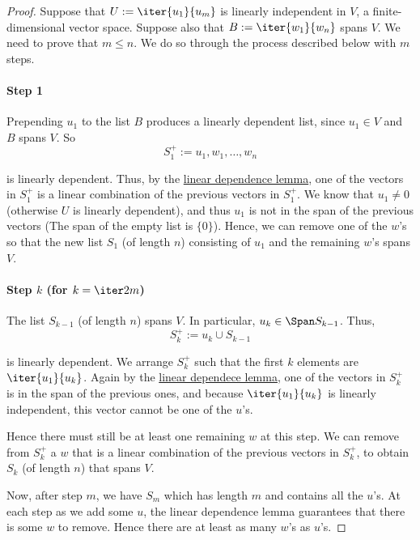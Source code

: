 \begin{proof}
  Suppose that $U:=\iter{u_1}{u_m}$ is linearly independent in $V$, a
  finite-dimensional vector space. Suppose also that $B:=\iter{w_1}{w_n}$ spans
  $V$. We need to prove that $m\leq n$. We do so through the process described
  below with $m$ steps.

  \paragraph{Step 1}

  Prepending $u_1$ to the list $B$ produces a linearly dependent list, since
  $u_1\in V$ and $B$ spans $V$. So
  $$
    S_1^+:=u_1,w_1,\ldots,w_n
  $$

  is linearly dependent. Thus, by the \href{ba96a6f}{linear dependence lemma},
  one of the vectors in $S_1^+$ is a linear combination of the previous vectors
  in $S_1^+$. We know that $u_1\neq0$ (otherwise $U$ is linearly dependent),
  and thus $u_1$ is not in the span of the previous vectors (The span of the
  empty list is $\{0\}$). Hence, we can remove one of the $w$'s so that the new
  list $S_1$ (of length $n$) consisting of $u_1$ and the remaining $w$'s spans
  $V$.

  \paragraph{Step $k$ (for $k=\iter2m$)}

  The list $S_{k-1}$ (of length $n$) spans $V$. In particular, $u_k\in\Span
  S_{k-1}$. Thus,
  $$
    S_k^+:=u_k\cup S_{k-1}
  $$

  is linearly dependent. We arrange $S_k^+$ such that the first $k$ elements
  are $\iter{u_1}{u_k}$. Again by the \href{ba96a6f}{linear dependece lemma},
  one of the vectors in $S_k^+$ is in the span of the previous ones, and
  because $\iter{u_1}{u_k}$ is linearly independent, this vector cannot be one
  of the $u$'s.

  Hence there must still be at least one remaining $w$ at this step. We can
  remove from $S_k^+$ a $w$ that is a linear combination of the previous
  vectors in $S_k^+$, to obtain $S_k$ (of length $n$) that spans $V$.

  Now, after step $m$, we have $S_m$ which has length $m$ and contains all the
  $u$'s. At each step as we add some $u$, the linear dependence lemma
  guarantees that there is some $w$ to remove. Hence there are at least as many
  $w$'s as $u$'s.
\end{proof}

